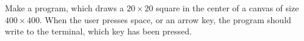 \label{canvas:key}
Make a program, which draws a $20\times 20$ square in the center of a canvas of size $400\times 400$. When the user presses space, or an arrow key, the program should write to the terminal, which key has been pressed.
